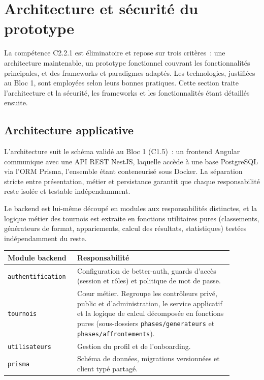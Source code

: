 

\section{Architecture et sécurité du prototype}
La compétence C2.2.1 est éliminatoire et repose sur trois critères~: une architecture maintenable, un prototype fonctionnel couvrant les fonctionnalités principales, et des frameworks et paradigmes adaptés. Les technologies, justifiées au Bloc 1, sont employées selon leurs bonnes pratiques. Cette section traite l'architecture et la sécurité, les frameworks et les fonctionnalités étant détaillés ensuite.

\subsection{Architecture applicative}
L'architecture suit le schéma validé au Bloc 1 (C1.5)~: un frontend Angular communique avec une API REST NestJS, laquelle accède à une base PostgreSQL via l'ORM Prisma, l'ensemble étant conteneurisé sous Docker. La séparation stricte entre présentation, métier et persistance garantit que chaque responsabilité reste isolée et testable indépendamment.

Le backend est lui-même découpé en modules aux responsabilités distinctes, et la logique métier des tournois est extraite en fonctions utilitaires pures (classements, générateurs de format, appariements, calcul des résultats, statistiques) testées indépendamment du reste.

\begin{table}[H]
    \centering
    \small
    \begin{tabular}{|>{\raggedright\arraybackslash}p{0.24\linewidth}|>{\raggedright\arraybackslash}p{0.64\linewidth}|}
        \hline
        \textbf{Module backend} & \textbf{Responsabilité} \\
        \hline
        \texttt{authentification} & Configuration de better-auth, guards d'accès (session et rôles) et politique de mot de passe. \\
        \hline
        \texttt{tournois} & Cœur métier. Regroupe les contrôleurs privé, public et d'administration, le service applicatif et la logique de calcul décomposée en fonctions pures (sous-dossiers \texttt{phases/generateurs} et \texttt{phases/affrontements}). \\
        \hline
        \texttt{utilisateurs} & Gestion du profil et de l'onboarding. \\
        \hline
        \texttt{prisma} & Schéma de données, migrations versionnées et client typé partagé. \\
        \hline
    \end{tabular}
\end{table}

